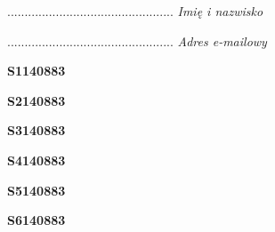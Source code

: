 \begin{turn}{90}\begin{minipage}{\linewidth} \vspace{20mm} ................................................  \textit{Imię i nazwisko}\end{minipage}\end{turn}

\begin{turn}{90}\begin{minipage}{\linewidth} \vspace{20mm} ................................................  \textit{Adres e-mailowy}\end{minipage}\end{turn}

\begin{turn}{90}\huge \begin{minipage}{\linewidth} \vspace{10mm}\textbf{S1140883}\end{minipage}\end{turn}

\begin{turn}{90}\huge \begin{minipage}{\linewidth} \vspace{10mm}\textbf{S2140883}\end{minipage}\end{turn}

\begin{turn}{90}\huge \begin{minipage}{\linewidth} \vspace{10mm}\textbf{S3140883}\end{minipage}\end{turn}

\begin{turn}{90}\huge \begin{minipage}{\linewidth} \vspace{10mm}\textbf{S4140883}\end{minipage}\end{turn}

\begin{turn}{90}\huge \begin{minipage}{\linewidth} \vspace{10mm}\textbf{S5140883}\end{minipage}\end{turn}

\begin{turn}{90}\huge \begin{minipage}{\linewidth} \vspace{10mm}\textbf{S6140883}\end{minipage}\end{turn}


